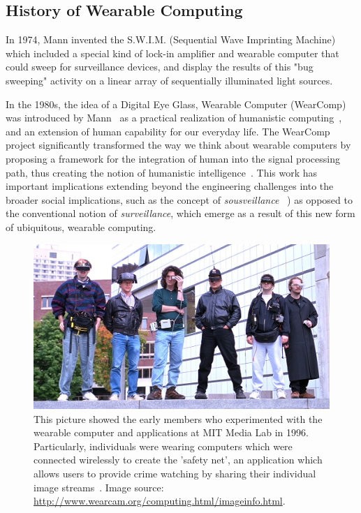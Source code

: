 \subsection{History of Wearable Computing}
In 1974, Mann invented the S.W.I.M. (Sequential Wave Imprinting Machine) which included a special kind of lock-in amplifier and wearable computer that could sweep for surveillance devices, and display the results of this "bug sweeping" activity on a linear array of sequentially illuminated light sources\cite{mann1992wavelets, impulse, mann2014sightfield, kineveillance}.

In the 1980s, the idea of a Digital Eye Glass, Wearable Computer (WearComp) was introduced by 
Mann~\cite{mannaaai361, mann1994mediated, mannwyckofftr, aimone2003eyetap} as a 
practical realization of humanistic computing~\cite{mann2001wearable, 
intelligentimageprocessing,presenceconnect,mann260}, and an extension of human capability for our 
everyday life. The WearComp project significantly transformed the way we think about wearable 
computers by proposing a framework for the integration of human into the signal processing path, 
thus creating the notion of humanistic intelligence~\cite{mann2001wearable, 
intelligentimageprocessing}. This work has important implications extending beyond the engineering 
challenges into the broader social implications, such as the concept of \emph{sousveillance}
~\cite{mann2002sousveillance, mann2004sousveillance, mann2006cyborglogging}) as opposed to 
the conventional notion of \emph{surveillance}, which emerge as a result of this new form of 
ubiquitous, wearable computing. 

\begin{figure}[htb]
\center
 \includegraphics[width=5.5in]{ch1/figures/cyborgs.jpg}
 \caption{This picture showed the early members who experimented with the wearable computer and applications at MIT Media Lab in 1996. Particularly, individuals were wearing computers which were connected wirelessly to create the 'safety net', an application which allows users to provide crime watching by sharing their individual image streams~\cite{mann1997smart}. Image source: \url{http://www.wearcam.org/computing.html/imageinfo.html}. 
 }
 \label{fig:cyborgs}
\end{figure}

